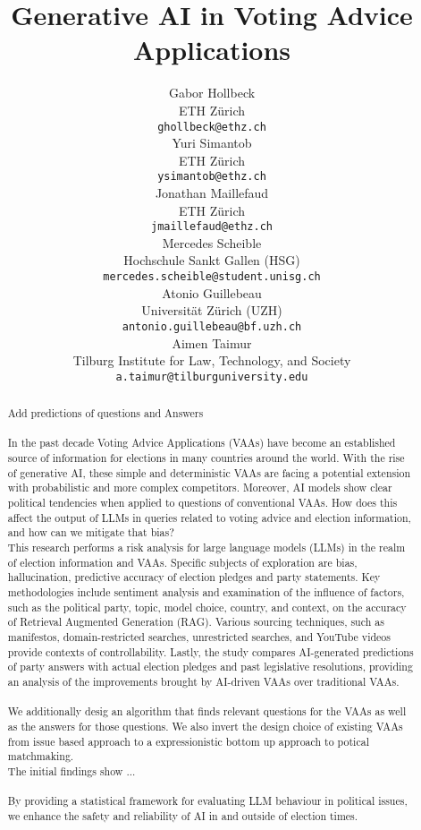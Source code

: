 \documentclass{article}
\title{Generative AI in Voting Advice Applications
}
\author{%
Gabor Hollbeck \\
  ETH Zürich\\
    \texttt{ghollbeck@ethz.ch} \\
  \And
  Yuri Simantob \\
  ETH Zürich\\
    \texttt{ysimantob@ethz.ch} \\
     \And
  Jonathan Maillefaud \\
  ETH Zürich\\
    \texttt{jmaillefaud@ethz.ch} \\
  \And
    Mercedes Scheible\\
  Hochschule Sankt Gallen (HSG)\\
\texttt{mercedes.scheible@student.unisg.ch} \\
\And
    Atonio Guillebeau\\
  Universität Zürich (UZH)\\
\texttt{antonio.guillebeau@bf.uzh.ch} \\
\And
    Aimen Taimur\\
  Tilburg Institute for Law, Technology, and Society\\
\texttt{a.taimur@tilburguniversity.edu} \\
}
\begin{document}
\maketitle

\begin{abstract}

Add predictions of questions and Answers\\\\

In the past decade Voting Advice Applications (VAAs) have become an established source of information for elections in many countries around the world. With the rise of generative AI, these simple and deterministic VAAs are facing a potential extension with probabilistic and more complex competitors. Moreover, AI models show clear political tendencies when applied to questions of conventional VAAs. How does this affect the output of LLMs in queries related to voting advice and election information, and how can we mitigate that bias? \\
This research performs a risk analysis for large language models (LLMs) in the realm of election information and VAAs. Specific subjects of exploration are bias, hallucination, predictive accuracy of election pledges and party statements. Key methodologies include sentiment analysis and examination of the influence of factors, such as the political party, topic, model choice, country, and context, on the accuracy of Retrieval Augmented Generation (RAG). Various sourcing techniques, such as manifestos, domain-restricted searches, unrestricted searches, and YouTube videos provide contexts of controllability. Lastly, the study compares AI-generated predictions of party answers with actual election pledges and past legislative resolutions, providing an analysis of the improvements brought by AI-driven VAAs over traditional VAAs.
\\
\\ We additionally desig an algorithm that finds relevant questions for the VAAs as well as the answers for those questions.  We also invert the design choice of existing VAAs from issue based approach to a expressionistic bottom up approach to potical matchmaking. \\
The initial findings show ... \\\\

By providing a statistical framework for evaluating LLM behaviour in political issues, we enhance the safety and reliability of AI in and outside of election times.


\end{abstract}
\end{document}
